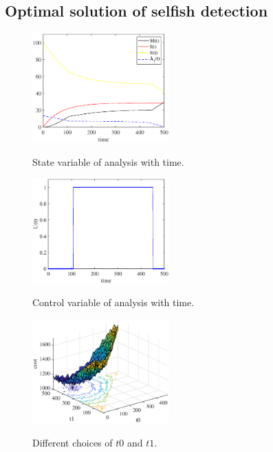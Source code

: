 \subsection{Optimal solution of selfish detection}
\begin{figure}
  \centering
  {\includegraphics[width=0.47\textwidth]{fig/state.eps}}
     \caption{State variable of analysis with time.}
     \label{fig:pe_opt_state_time}
\end{figure}
\begin{figure}
  \centering
  {\includegraphics[width=0.47\textwidth]{fig/Ut.eps}}
     \caption{Control variable of analysis with time.}
     \label{fig:pe_opt_control_Ut}
\end{figure}
\begin{figure}
  \centering
  {\includegraphics[width=0.47\textwidth]{fig/cost_all_t0t1.eps}}
     \caption{Different choices of $t0$ and $t1$.}
     \label{fig:pe_diff_choices}
\end{figure}
